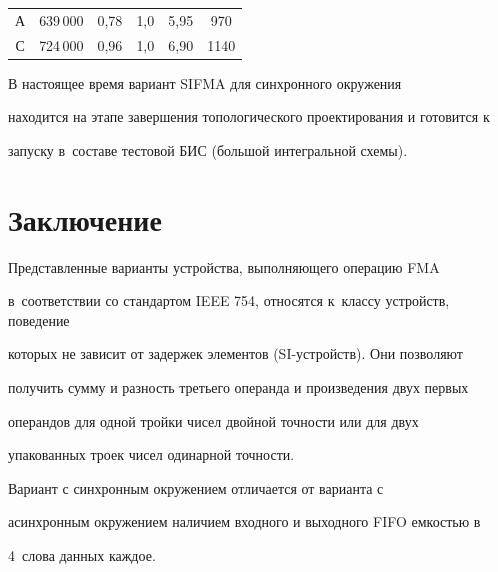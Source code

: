 \begin{table}
\begin{center}
\begin{tabular}{|c|c|c|c|c|c|}
\hline

А& 639\,000& 0,78& 1,0& 5,95& \hphantom{9}970\\

С& 724\,000 & 0,96& 1,0& 6,90& 1140\\

\hline

\end{tabular}

\end{center}

\vspace*{-6pt}

\end{table}



В настоящее время вариант SIFMA для синхронного окружения

находится на этапе завершения топологического проектирования и готовится к

запуску в~составе тестовой БИС (большой интегральной схемы).



\vspace*{-2pt}



\section{Заключение}



\vspace*{-1pt}



      Представленные варианты устройства, выполняющего операцию FMA

      в~соответствии со стандартом IEEE 754, относятся к~классу устройств, поведение

которых не зависит от задержек элементов (SI-устройств). Они позволяют

получить сумму и разность третьего операнда и произведения двух первых

операндов для одной тройки чисел двойной точности или для двух

упакованных троек чисел одинарной точности.



      Вариант с синхронным окружением отличается от варианта с

асинхронным окружением наличием входного и выходного FIFO емкостью в

4~слова данных каждое.



